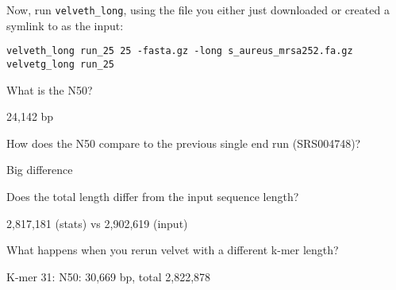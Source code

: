 \begin{steps}
Now, run \texttt{velveth\_long}, using the file you either just downloaded or created a
symlink to as the input:
\begin{lstlisting}
velveth_long run_25 25 -fasta.gz -long s_aureus_mrsa252.fa.gz
velvetg_long run_25
\end{lstlisting}

\end{steps}

\begin{questions}
What is the N50?
\begin{answer}
24,142 bp
\end{answer}

How does the N50 compare to the previous single end run (SRS004748)?
\begin{answer}
Big difference
\end{answer}
  
Does the total length differ from the input sequence length?
\begin{answer}
2,817,181 (stats) vs 2,902,619 (input)
\end{answer}
  
What happens when you rerun velvet with a different k-mer length?
\begin{answer}
K-mer 31: N50: 30,669 bp, total 2,822,878
\end{answer}

\end{questions}
